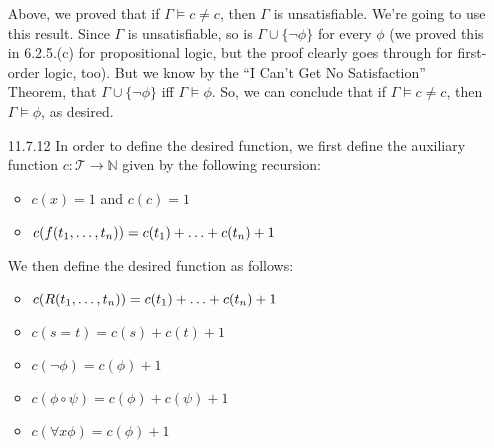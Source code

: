 \begin{itemize}
                              Above, we proved that if $\Gamma\vDash
                              c\neq c$, then $\Gamma$ is
                              unsatisfiable. We're going to use this
                              result. Since $\Gamma$ is unsatisfiable,
                              so is $\Gamma\cup\{\neg\phi\}$ for every
                              $\phi$ (we proved this in 6.2.5.(c) for
                              propositional logic, but the proof
                              clearly goes through for first-order
                              logic, too). But we know by the ``I
                              Can't Get No Satisfaction'' Theorem,
                              that $\Gamma\cup\{\neg\phi\}$ iff
                              $\Gamma\vDash\phi$. So, we can conclude
                              that if $\Gamma\vDash
                              c\neq c$, then $\Gamma\vDash\phi$, as
                              desired.

                              \item[11.7.12] In order to define the
                                desired function, we first define the
                                auxiliary function
                                $c:\mathcal{T}\to\mathbb{N}$ given by
                                the following recursion:
                                \begin{itemize}
                                \item $c(x)=1$ and $c(c)=1$
                                \item $c(f(t_1, \mathellipsis, t_n))=c(t_1)+\mathellipsis+c(t_n)+1$
                                \end{itemize}
                               We then define the desired function as
                               follows:
                               \begin{itemize}
                               \item $c(R(t_1, \mathellipsis,
                                 t_n))=c(t_1)+\mathellipsis+c(t_n)+1$

                               \item $c(s=t)=c(s)+c(t)+1$

                               \item $c(\neg \phi)=c(\phi)+1$
                               \item
                                 $c(\phi\circ\psi)=c(\phi)+c(\psi)+1$
                               \item $c(\forall x\phi)=c(\phi)+1$
                               \end{itemize}


\end{itemize}
